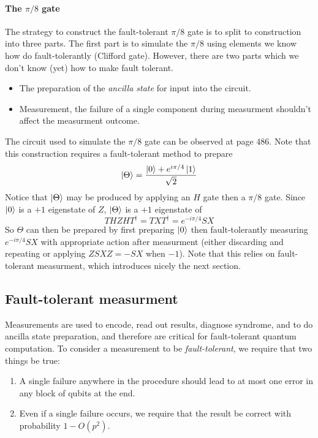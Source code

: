\documentclass[11pt,a4paper]{article}
\theoremstyle{definition}
\theoremstyle{plain}
\theoremstyle{remark}
\begin{document}
\paragraph{The $\pi/8$ gate}
The strategy to construct the fault-tolerant $\pi/8$ gate is to split to construction into three parts. 
The first part is to simulate the $\pi/8$ using elements we know how do fault-tolerantly (Clifford gate). However, 
there are two parts which we don't know (yet) how to make fault tolerant. 
\begin{itemize}
  \item The preparation of the \emph{ancilla state} for input into the circuit. 
  \item Measurement, the failure of a single component during measurment shouldn't affect the measurment outcome. 
\end{itemize}
The circuit used to simulate the $\pi / 8$ gate can be observed at page $486$. 
Note that this construction requires a fault-tolerant method to prepare 
$$\ket{\Theta} = \frac{\ket{0} + e^{i \pi / 4} \ket{1}}{\sqrt{2}}$$
Notice that $\ket{\Theta}$ may be produced by applying an $H$ gate then a $\pi/8$ gate. 
Since $\ket{0}$ is a $+1$ eigenstate of $Z$, $\ket{\Theta}$ is a $+1$ eigenstate of 
$$THZHT^\dagger = TXT^\dagger = e^{- i \pi/4} SX$$
So $\Theta$ can then be prepared by first preparing $\ket{0}$ then fault-tolerantly measuring $e^{-i \pi / 4} SX$ 
with appropriate action after measurment (either discarding and repeating or applying $ZSXZ = - SX$ when $-1$). 
Note that this relies on fault-tolerant measurment, which introduces nicely the next section. 

\subsection{Fault-tolerant measurment} 
Measurements are used to encode, read out results, diagnose syndrome, and to do ancilla state preparation, and 
therefore are critical for fault-tolerant quantum computation. To consider a measurement to be \emph{fault-tolerant}, 
we require that two things be true: 
\begin{enumerate}
  \item A single failure anywhere in the procedure should lead to at most one error in any block of qubits at the end. 
  \item Even if a single failure occurs, we require that the result be correct with probability $1 - O(p^2)$. 
\end{enumerate}
\end{document}
